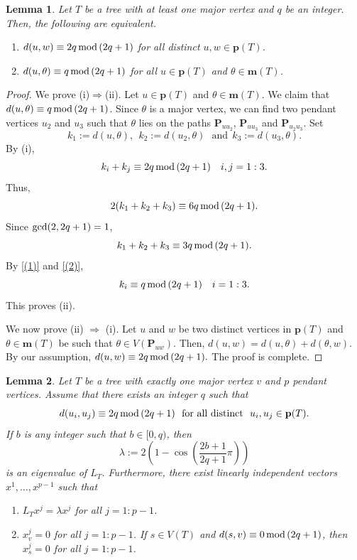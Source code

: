 \documentclass[preprint,12pt]{elsarticle}
\newcommand{\1}{\mathbf{1}}
\newcommand{\0}{\mathbf{0}}
\newcommand{\p}{{\mathbf{P}}}
\def\m{\mathbf{m}}
\def\pt{\mathbf{p}}
\def\p{\mathbf{P}}
\newtheorem{lemma}{Lemma}
\begin{document}
\begin{lemma}\label{equiv}
  Let $T$ be a tree with at least one major vertex and $q$ be an integer. Then, the following are equivalent.
  \begin{enumerate}
      \item[\rm{(i)}] $d(u,w) \equiv 2q\,{\rm{mod}}\,(2q+1)$ for all distinct $u,w \in \pt(T)$.
      \item[\rm{(ii)}] $d(u,\theta) \equiv q\, {\rm{mod}}\, (2q+1)$ for all $u \in \pt(T)$ and $\theta \in \m(T)$.
  \end{enumerate}
  \end{lemma}

\begin{proof}
 We prove (i)$\Rightarrow$(ii). Let $u\in \pt(T)$ and $\theta\in \m(T)$. We claim that $d(u,\theta)\equiv q\,{\rm{mod}}\,(2q+1)$. Since $\theta$
 is a major vertex, we can find two pendant vertices $u_2$ and $u_3$ such that $\theta$ lies on the paths $\p_{uu_2}$, $\p_{uu_3}$ and $\p_{u_2u_3}$. 
 Set
 \[k_1:=d(u,\theta),~~k_2:=d(u_2, \theta)~~~\mbox{and}~~k_3:=d(u_3,\theta).\] 
 By (i),
 \begin{equation}\label{(1)}
     k_i+k_j \equiv 2q\,{\rm{mod}}\,(2q+1)~~~i,j=1:3.
     \end{equation}
Thus, \[2(k_1+k_2+k_3) \equiv 6q\, {\rm{mod}}\, (2q+1).\]  Since ${\rm{gcd}}(2,2q+1)=1$,
\begin{equation}\label{(2)}
    k_1+k_2+k_3\equiv 3q\,{\rm{mod}}\, (2q+1).
\end{equation}
By \eqref{(1)} and \eqref{(2)}, 
\[k_i\equiv q\,{\rm{mod}}\,(2q+1)~~~i=1:3.\]
This proves (ii).

 We now prove (ii) $\Rightarrow$ (i). Let $u$ and $w$ be two distinct vertices in $\pt(T)$ and 
$\theta \in \m(T)$ be such that $\theta \in V(\p_{uw})$. Then,
\(d(u,w)=d(u,\theta)+d(\theta,w).\)
By our assumption,
\(d(u,w)\equiv 2q\,{\rm{mod}}\,(2q+1).\)
The proof is complete.
\end{proof}

\begin{lemma}\label{lem6base}
Let $T$ be a tree with exactly one major vertex $v$
and $p$ pendant vertices.
Assume that there exists an integer $q$ 
such that
\[d(u_i,u_j)\equiv 2q\,{\rm{mod}}\,(2q+1)~~\mbox{for all distinct}~~u_i,u_j \in \pt(T).
\]
If $b$ is any integer such that $b \in [0,q)$, then
\[\lambda:=2\left(1- \cos \left(\frac{2b+1}{2q+1}\pi\right) \right)\]
is an eigenvalue of $L_T$. Furthermore,
there exist linearly independent vectors $x^1,\dots,x^{p-1}$
such that 
\begin{enumerate}
\item[\rm (a)] $L_Tx^j=\lambda x^j$ for all $j=1:p-1$.
\item[{\rm (b)}] %
$x^j_{v}=0$ for all $j=1:p-1$. If $s \in V(T)$ and
$d(s,v) \equiv 0\,{\rm{mod}}\,(2q+1)$, then $x^j_{s}=0$ for all $j=1:p-1$. 
\end{enumerate}
\end{lemma}
\end{document}
